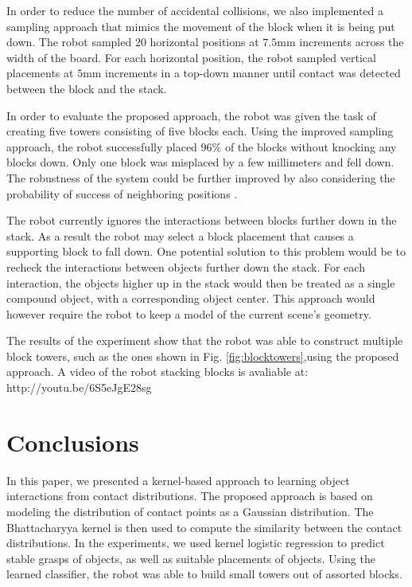 In order to reduce the number of accidental collisions, we also implemented
a sampling approach that mimics the movement of the block when it is being put down. 
The robot sampled $20$ horizontal positions at $7.5$mm 
increments across the width of the board. For each horizontal position, the robot sampled
vertical placements at $5$mm increments in a top-down manner until
contact was detected between the block and the stack. 

In order to evaluate the proposed approach, the robot was given 
the task of creating five towers consisting of five blocks each. 
Using the improved sampling approach, the robot
successfully placed $96\%$ of the blocks without knocking any blocks down. 
Only one block was  misplaced by a few millimeters and fell down. The robustness of
the system could be further improved by  also considering the probability of 
success of neighboring positions \cite{Boularias2011}.  

The robot currently ignores the interactions between blocks further down 
in the stack. As a result the robot may select
a block placement that causes a supporting block to fall down. One potential
solution to this problem would be to recheck the interactions between
objects further down the stack. For each interaction, the objects
higher up in the stack would then be treated as a single compound
object, with a corresponding object center. This approach would however
require the robot to keep a model of the current scene's geometry. 

 The results of the experiment show that the robot was able to construct multiple
block towers, such as the ones shown in Fig. \ref{fig:blocktowers},using the proposed approach.
A video of the robot stacking blocks is avaliable at: http://youtu.be/6S5eJgE28sg


\section{Conclusions}

In this paper, we presented a kernel-based approach to learning
object interactions from contact distributions. The proposed approach
is based on modeling the distribution of contact points as a Gaussian
distribution. The Bhattacharyya kernel is then used to compute
the similarity between the contact distributions. In the experiments,
we used kernel logistic regression to predict stable grasps of objects,
as well as suitable placements of objects. Using the learned classifier,
the robot was able to build small towers out of assorted blocks. 


%
